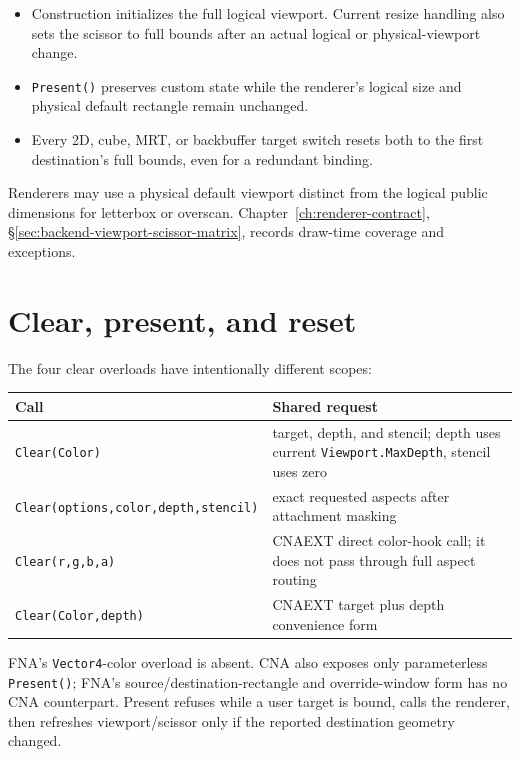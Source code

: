 \begin{itemize}
  \item Construction initializes the full logical viewport. Current resize handling also sets
        the scissor to full bounds after an actual logical or physical-viewport change.
  \item \texttt{Present()} preserves custom state while the renderer's logical size and physical
        default rectangle remain unchanged.
  \item Every 2D, cube, MRT, or backbuffer target switch resets both to the first destination's
        full bounds, even for a redundant binding.
\end{itemize}

Renderers may use a physical default viewport distinct from the logical public dimensions for
letterbox or overscan. Chapter~\ref{ch:renderer-contract},
\S\ref{sec:backend-viewport-scissor-matrix}, records draw-time coverage and exceptions.

\section{Clear, present, and reset}
\label{sec:clear-present-reset}

The four clear overloads have intentionally different scopes:

\begin{center}
\small
\begin{tabular}{@{}p{}p{}@{}}
\toprule
\textbf{Call} & \textbf{Shared request} \\
\midrule
\texttt{Clear(Color)} & target, depth, and stencil; depth uses current \texttt{Viewport.MaxDepth}, stencil uses zero \\
\texttt{Clear(options,color,depth,stencil)} & exact requested aspects after attachment masking \\
\texttt{Clear(r,g,b,a)} & CNAEXT direct color-hook call; it does not pass through full aspect routing \\
\texttt{Clear(Color,depth)} & CNAEXT target plus depth convenience form \\
\bottomrule
\end{tabular}
\end{center}

FNA's \texttt{Vector4}-color overload is absent. CNA also exposes only parameterless
\texttt{Present()}; FNA's source/destination-rectangle and override-window form has no CNA
counterpart. Present refuses while a user target is bound, calls the renderer, then refreshes
viewport/scissor only if the reported destination geometry changed.

